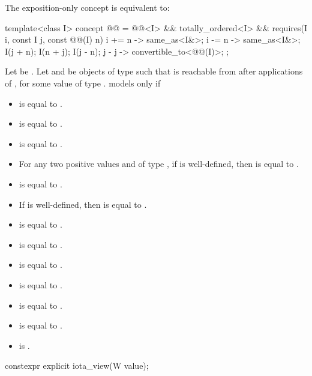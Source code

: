 \pnum
The exposition-only  concept is equivalent to:
\begin{itemdecl}
template<class I>
  concept @@ =
    @@<I> && totally_ordered<I> &&
    requires(I i, const I j, const @@(I) n) {
      { i += n } -> same_as<I&>;
      { i -= n } -> same_as<I&>;
      I(j + n);
      I(n + j);
      I(j - n);
      { j - j } -> convertible_to<@@(I)>;
    };
\end{itemdecl}

Let  be .
Let  and  be objects of type  such that
 is reachable from 
after  applications of ,
for some value  of type .
 models  only if
\begin{itemize}
\item {} is equal to .
\item {} is equal to .
\item {} is equal to .
\item For any two positive values
   and  of type ,
  if  is well-defined, then
   is equal to .
\item {} is equal to .
\item If  is well-defined, then
   is equal to .
\item {} is equal to .
\item {} is equal to .
\item {} is equal to .
\item {} is equal to .
\item {} is equal to .
\item {} is equal to .
\item {} is .
\end{itemize}

%
\begin{itemdecl}
constexpr explicit iota_view(W value);
\end{itemdecl}

